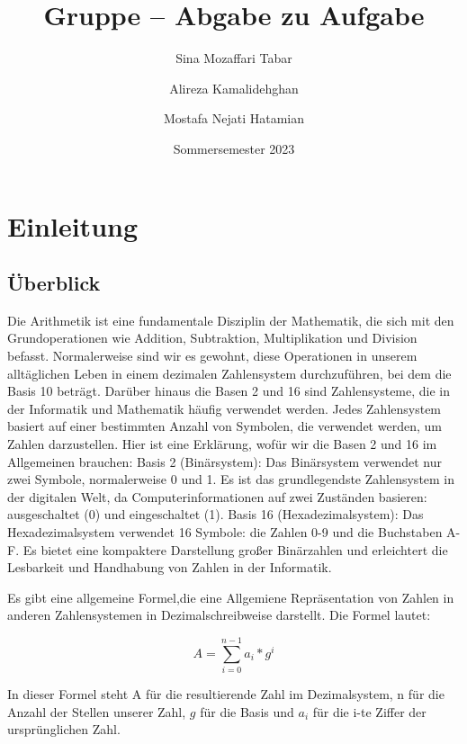 \documentclass[course=erap]{aspdoc}
\author{Sina Mozaffari Tabar \and Alireza Kamalidehghan  \and Mostafa Nejati Hatamian}
\date{Sommersemester 2023} %
\title{Gruppe \theGroup{} -- Abgabe zu Aufgabe \theNumber}
\begin{document}
\maketitle

\section{Einleitung}
\subsection{Überblick}
Die Arithmetik ist eine fundamentale Disziplin der Mathematik, die sich mit den Grundoperationen wie Addition, Subtraktion, Multiplikation und Division befasst. Normalerweise sind wir es gewohnt, diese Operationen in unserem alltäglichen Leben in einem dezimalen Zahlensystem durchzuführen, bei dem die Basis 10 beträgt.
\newline
Darüber hinaus die Basen 2 und 16 sind Zahlensysteme, die in der Informatik und Mathematik häufig verwendet werden. Jedes Zahlensystem basiert auf einer bestimmten Anzahl von Symbolen, die verwendet werden, um Zahlen darzustellen. Hier ist eine Erklärung, wofür wir die Basen 2 und 16 im Allgemeinen brauchen:
\newline
\newline
Basis 2 (Binärsystem):
Das Binärsystem verwendet nur zwei Symbole, normalerweise 0 und 1. Es ist das grundlegendste Zahlensystem in der digitalen Welt, da Computerinformationen auf zwei Zuständen basieren: ausgeschaltet (0) und eingeschaltet (1).
\newline
\newline
Basis 16 (Hexadezimalsystem):
Das Hexadezimalsystem verwendet 16 Symbole: die Zahlen 0-9 und die Buchstaben A-F. Es bietet eine kompaktere Darstellung großer Binärzahlen und erleichtert die Lesbarkeit und Handhabung von Zahlen in der Informatik.
\newline
\par
Es gibt eine allgemeine Formel,die eine Allgemiene Repräsentation von Zahlen in anderen Zahlensystemen in Dezimalschreibweise darstellt. Die Formel lautet:

\begin{equation}
\label{sumFormel}
    A = \sum_{i=0} ^{n-1} a_i * g^i
\end{equation}


In dieser Formel steht A für die resultierende Zahl im Dezimalsystem, n für die Anzahl der Stellen unserer Zahl, $g$ für die Basis und $a_i$ für die i-te Ziffer der ursprünglichen Zahl.
\newline
\end{document}
